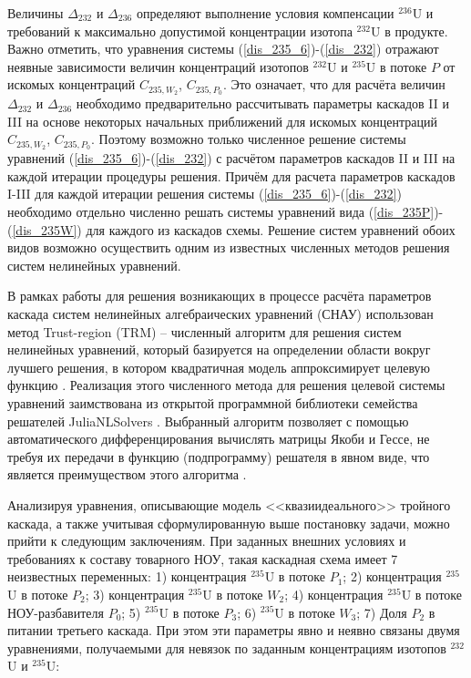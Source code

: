 {Величины $\Delta_{232}$ и $\Delta_{236}$ определяют выполнение условия компенсации $^{236}$U и требований к максимально допустимой концентрации изотопа $^{232}$U в продукте. Важно отметить, что уравнения системы (\ref{dis_235_6})-(\ref{dis_232}) отражают неявные зависимости величин концентраций изотопов $^{232}$U и $^{235}$U в потоке $P$ от искомых концентраций $C_{235,{W_2}}$, $C_{235,{P_0}}$. Это означает, что для расчёта величин $\Delta_{232}$ и $\Delta_{236}$ необходимо предварительно рассчитывать параметры каскадов II и III на основе некоторых начальных приближений для искомых концентраций $C_{235,{W_2}}$, $C_{235,{P_0}}$. Поэтому возможно только численное решение системы уравнений (\ref{dis_235_6})-(\ref{dis_232}) с расчётом параметров каскадов II и III на каждой итерации процедуры решения. Причём для расчета параметров каскадов I-III для каждой итерации решения системы (\ref{dis_235_6})-(\ref{dis_232}) необходимо отдельно численно решать системы уравнений вида (\ref{dis_235P})-(\ref{dis_235W}) для каждого из каскадов схемы. Решение систем уравнений обоих видов возможно осуществить одним из известных численных методов решения систем нелинейных уравнений. 

В рамках работы для решения возникающих в процессе расчёта параметров каскада систем нелинейных алгебраических уравнений (СНАУ) использован метод Trust-region (TRM) -- численный алгоритм для решения систем нелинейных уравнений, который базируется на определении области вокруг лучшего решения, в котором квадратичная модель аппроксимирует целевую функцию \cite{NumericalOptimization2006}. Реализация этого численного метода для решения целевой системы уравнений заимствована из открытой программной библиотеки семейства решателей JuliaNLSolvers \cite{mogensenJuliaNLSolversNLsolveJl2020}. Выбранный алгоритм позволяет с помощью автоматического дифференцирования вычислять матрицы Якоби и Гессе, не требуя их передачи в функцию (подпрограмму) решателя в явном виде, что является преимуществом этого алгоритма \cite{айда-задеБыстроеАвтоматическоеДифференцирование1989,revelsForwardModeAutomaticDifferentiation2016}.

Анализируя уравнения, описывающие модель <<квазиидеального>> тройного каскада, а также учитывая сформулированную выше постановку задачи, можно прийти к следующим заключениям. При заданных внешних условиях и требованиях к составу товарного НОУ, такая каскадная схема имеет 7 неизвестных переменных: 1) концентрация $^{235}$U в потоке $P_{1}$; 2) концентрация $^{235}$U в потоке $P_{2}$; 3) концентрация $^{235}$U в потоке $W_{2}$; 4) концентрация $^{235}$U в потоке НОУ-разбавителя $P_{0}$; 5) $^{235}$U в потоке $P_{3}$; 6) $^{235}$U в потоке $W_{3}$; 7) Доля $P_2$ в питании третьего каскада. При этом эти параметры явно и неявно связаны двумя уравнениями, получаемыми для невязок по заданным концентрациям изотопов $^{232}$U и $^{235}$U:

}
